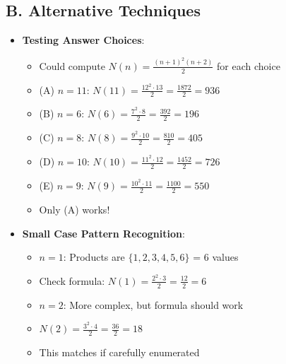 \documentclass[12pt]{article}
\begin{document}
\begin{techniquesbox}
\subsection*{B. Alternative Techniques}
\begin{itemize}[leftmargin=*]
    \item \textbf{Testing Answer Choices}:
    \begin{itemize}
        \item Could compute $N(n) = \frac{(n+1)^2(n+2)}{2}$ for each choice
        \item (A) $n=11$: $N(11) = \frac{12^2 \cdot 13}{2} = \frac{1872}{2} = 936$ \checkmark
        \item (B) $n=6$: $N(6) = \frac{7^2 \cdot 8}{2} = \frac{392}{2} = 196$
        \item (C) $n=8$: $N(8) = \frac{9^2 \cdot 10}{2} = \frac{810}{2} = 405$
        \item (D) $n=10$: $N(10) = \frac{11^2 \cdot 12}{2} = \frac{1452}{2} = 726$
        \item (E) $n=9$: $N(9) = \frac{10^2 \cdot 11}{2} = \frac{1100}{2} = 550$
        \item Only (A) works!
    \end{itemize}
    \item \textbf{Small Case Pattern Recognition}:
    \begin{itemize}
        \item $n=1$: Products are $\{1,2,3,4,5,6\}$ = 6 values
        \item Check formula: $N(1) = \frac{2^2 \cdot 3}{2} = \frac{12}{2} = 6$ \checkmark
        \item $n=2$: More complex, but formula should work
        \item $N(2) = \frac{3^2 \cdot 4}{2} = \frac{36}{2} = 18$
        \item This matches if carefully enumerated
    \end{itemize}
\end{itemize}


\end{techniquesbox}
\end{document}
